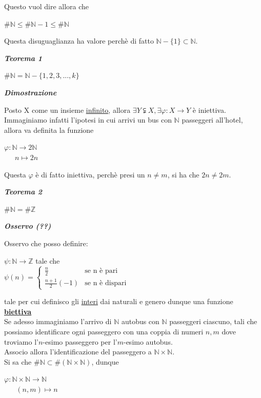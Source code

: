 \documentclass{article}
\theoremstyle{definition}
\begin{document}
Questo vuol dire allora che
\begin{center}
$\#\mathbb{N} \leqslant \#\mathbb{N}-1 \leqslant \# \mathbb{N}$
\end{center}
Questa disuguaglianza ha valore perchè di fatto $\mathbb{N}- \{1\} \subset \mathbb{N}$.

\begin{center}
    \textbf{\textit{Teorema 1}}
\end{center}
\begin{center}
    $\#\mathbb{N}=\mathbb{N}- \{1,2,3,...,k\}$
\end{center}
\begin{center}
    \textbf{\textit{Dimostrazione}}
\end{center}
Posto X come un insieme \underline{infinito}, allora $\exists Y \subsetneqq X, \exists \varphi: X \to Y$ è iniettiva.
Immaginiamo infatti l'ipotesi in cui arrivi un bus con $\mathbb{N}$ passeggeri all'hotel, allora va definita la funzione
\begin{center}
    $\varphi : \mathbb{N} \to 2\mathbb{N}$
    \\ \,\,\,\,\,\,\, $n \mapsto 2n$
\end{center}
Questa $\varphi$ è di fatto iniettiva, perchè presi un $n\neq m$, si ha che $2n \neq 2m$.


\begin{center}
\textbf{\textit{Teorema 2}} 
\end{center}
\begin{center}
    $\#\mathbb{N}=\#\mathbb{Z}$
\end{center}
\begin{center}
    \textbf{\textit{Osservo (??)}}
\end{center}
Osservo che posso definire:
\begin{center}
    $\psi: \mathbb{N} \to \mathbb{Z}$ tale che
    \\
        $\psi(n)= \left\{\begin{array}{cc}
      \frac{n}{2}   & \mbox{se n è pari} \\
       \frac{n+1}{2}(-1)  & \mbox{se n è dispari}
    \end{array} \right.  $
\end{center}

tale per cui definisco gli \underline{interi} dai naturali e genero dunque una funzione \textbf{\underline{biettiva}}
\\
Se adesso immaginiamo l'arrivo di $\mathbb{N}$ autobus con $\mathbb{N}$ passeggeri ciascuno, tali che possiamo identificare ogni passeggero con una coppia di numeri $n,m$ dove troviamo l'$n$-esimo passeggero per l'$m$-esimo autobus.
\\
Associo allora l'identificazione del passeggero a $\mathbb{N} \times \mathbb{N}$.
\\
Si sa che $\#\mathbb{N} \subset \# (\mathbb{N} \times \mathbb{N})$, dunque
\begin{center}
    $\varphi: \mathbb{N} \times \mathbb{N} \to \mathbb{N}$
    \\ \,\,\,\,\,\,\,\,\,\,$(n,m) \mapsto n$
\end{center}
\end{document}

